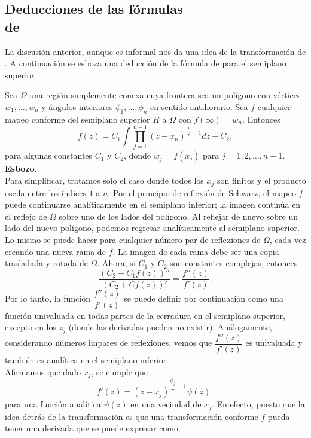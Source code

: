 \subsection{Deducciones de las fórmulas \\de \SC}
La discusión anterior, aunque es informal nos da una idea de la transformación de \SC. A continuación se esboza una deducción de la fórmula de \SC \; para el semiplano superior
\begin{teor}
	Sea $\Omega$ una región simplemente conexa cuya frontera sea un polígono con vértices $w_1,\ldots,w_n$ y ángulos interiores $\phi_1, \ldots,\phi_n $ en sentido antihorario. Sea $f$ cualquier mapeo conforme del semiplano superior $H$ a $\Omega$ con $f (\infty) = w_n$. Entonces
	\begin{equation}\label{SCSP}
		f(z)=C_1\int \prod_{j=1}^{n-1}(z-x_n)^{\frac{\phi_j}{\pi}-1} dz +C_2,
	\end{equation}
	para algunas constantes $C_1$ y $C_2$, donde $w_j=f(x_j)$ para $j=1,2,\ldots,n-1$. \\
	\textbf{Esbozo.}\\Para simplificar, tratamos solo el caso donde todos los $x_j$ son finitos y el producto oscila entre los índices $1$ a $n$. Por el principio de reflexión de Schwarz,  el mapeo $f$ puede continuarse analíticamente en el semiplano inferior; la imagen continúa en el reflejo de $\Omega$ sobre uno de los lados del polígono. Al reflejar de nuevo sobre un lado del nuevo polígono, podemos regresar analíticamente al semiplano superior. Lo mismo se puede hacer para cualquier número par de reflexiones de $\Omega$, cada vez creando una nueva rama de $f$. La imagen de cada rama debe ser una copia trasladada y rotada de $\Omega$. Ahora, si $C_1$ y $C_2$ son constantes complejas, entonces
	$$\dfrac{(C_2+C_1f(z))''}{(C_2+Cf(z))'}=\dfrac{f''(z)}{f'(z)}.$$
	Por lo tanto, la función $\dfrac{f''(z)}{f'(z)}$ se puede definir por  continuación como una función univaluada en todas partes de la cerradura en el semiplano superior, excepto en los $z_j$ (donde las derivadas pueden no existir). Análogamente, considerando números impares de reflexiones, vemos que $\dfrac{f''(z)}{f'(z)}$ 	es univaluada y también es analítica en el semiplano inferior.\\
	Afirmamos que dado $x_j$, se cumple que 
	$$f'(z)=(z-x_j)^{\dfrac{\phi_j}{\pi}-1}\psi(z),$$
	para una función analítica $\psi(z)$ en una vecindad de $x_j$. En efecto, puesto 	que la idea detrás de la transformación \SC \; es que una transformación conforme $f$ pueda tener una derivada que se puede expresar 	como

\end{teor}
